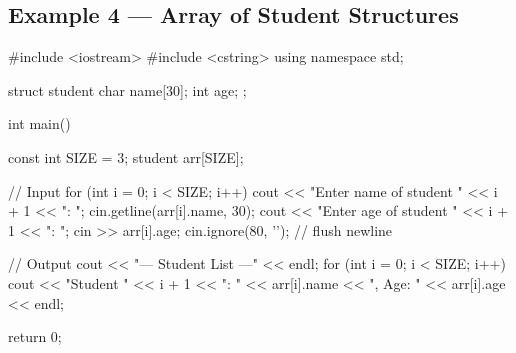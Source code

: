 \begin{center}
\end{center}

\subsection{Example 4 --- Array of Student Structures}

\begin{cppcode}
#include <iostream>
#include <cstring>
using namespace std;

struct student {
    char name[30];
    int  age;
};

int main() {
    const int SIZE = 3;
    student arr[SIZE];

    // Input
    for (int i = 0; i < SIZE; i++) {
        cout << "Enter name of student " << i + 1 << ": ";
        cin.getline(arr[i].name, 30);
        cout << "Enter age of student " << i + 1 << ":  ";
        cin  >> arr[i].age;
        cin.ignore(80, '\n');   // flush newline
    }

    // Output
    cout << "\n--- Student List ---" << endl;
    for (int i = 0; i < SIZE; i++) {
        cout << "Student " << i + 1 << ": "
             << arr[i].name << ", Age: "
             << arr[i].age  << endl;
    }

    return 0;
}
\end{cppcode}

